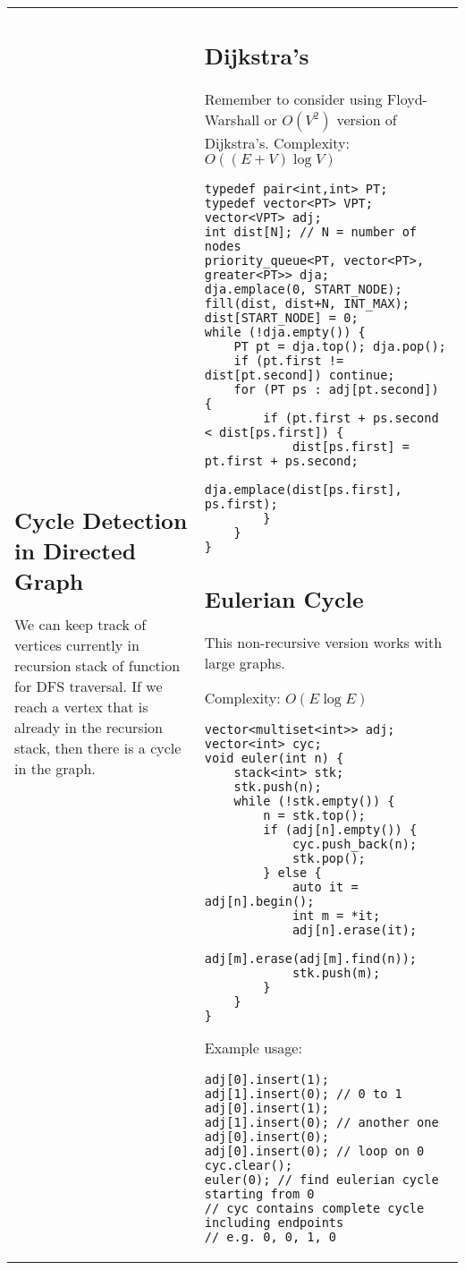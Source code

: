 \documentclass[letterpaper]{article}
\begin{document}
\begin{tabular}{@{}p{9cm}p{9cm}@{}}
\subsection{Cycle Detection in Directed Graph}

We can keep track of vertices currently in recursion stack of function for DFS traversal. If we reach a vertex that is already in the recursion stack, then there is a cycle in the graph.
&
\subsection{Dijkstra's}

Remember to consider using Floyd-Warshall or $O\left(V^2\right)$ version of Dijkstra's. Complexity: $O\left(\left(E+V\right)\log V\right)$

\begin{lstlisting}
typedef pair<int,int> PT;
typedef vector<PT> VPT;
vector<VPT> adj;
int dist[N]; // N = number of nodes
priority_queue<PT, vector<PT>, greater<PT>> dja;
dja.emplace(0, START_NODE);
fill(dist, dist+N, INT_MAX);
dist[START_NODE] = 0;
while (!dja.empty()) {
	PT pt = dja.top(); dja.pop();
	if (pt.first != dist[pt.second]) continue;
	for (PT ps : adj[pt.second]) {
		if (pt.first + ps.second < dist[ps.first]) {
			dist[ps.first] = pt.first + ps.second;
			dja.emplace(dist[ps.first], ps.first);
		}
	}
}
\end{lstlisting}

\subsection{Eulerian Cycle}

This non-recursive version works with large graphs.

Complexity: $O(E\log E)$

\begin{lstlisting}
vector<multiset<int>> adj;
vector<int> cyc;
void euler(int n) {
	stack<int> stk;
	stk.push(n);
	while (!stk.empty()) {
		n = stk.top();
		if (adj[n].empty()) {
			cyc.push_back(n);
			stk.pop();
		} else {
			auto it = adj[n].begin();
			int m = *it;
			adj[n].erase(it);
			adj[m].erase(adj[m].find(n));
			stk.push(m);
		}
	}
}
\end{lstlisting}

Example usage:
\begin{lstlisting}
adj[0].insert(1); adj[1].insert(0); // 0 to 1
adj[0].insert(1); adj[1].insert(0); // another one
adj[0].insert(0); adj[0].insert(0); // loop on 0
cyc.clear();
euler(0); // find eulerian cycle starting from 0
// cyc contains complete cycle including endpoints
// e.g. 0, 0, 1, 0
\end{lstlisting}

\end{tabular}
\end{document}
